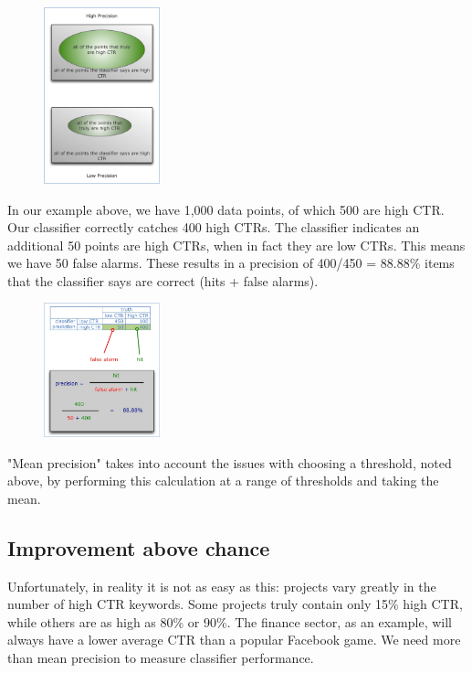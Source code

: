 \begin{figure}
\centering
\includegraphics[width=0.3\textwidth]{img/testclass/6.png}
\caption{
}
\label{Fig.1}
\end{figure}

In our example above, we have 1,000 data points, of which 500 are high CTR. Our classifier correctly catches 400 high CTRs. The classifier indicates an additional 50 points are high CTRs, when in fact they are low CTRs. This means we have 50 false alarms. These results in a precision of 400/450 = 88.88\% items that the classifier says are correct (hits + false alarms).

\begin{figure}
\centering
\includegraphics[width=0.3\textwidth]{img/testclass/7.png}
\caption{
}
\label{Fig.1}
\end{figure}

"Mean precision" takes into account the issues with choosing a threshold, noted above, by performing this calculation at a range of thresholds and taking the mean.

\subsection*{Improvement above chance}
Unfortunately, in reality it is not as easy as this: projects vary greatly in the number of high CTR keywords. Some projects truly contain only 15\% high CTR,
 while others are as high as 80\% or 90\%. The finance sector, as an example, will always have a lower average CTR than a popular Facebook game.  We need more than mean precision to measure classifier performance.

